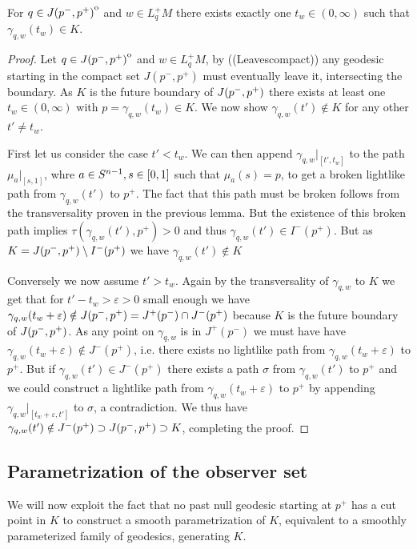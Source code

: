 \begin{lemma}\label{lem:hitsonce}
    For $q\in {\kern0ptJ(p^-,p^+)}^{\mathrm{o}}$ and $w\in L^+_qM$ there exists exactly one $t_w\in (0,\infty)$ such that $\gamma_{q,w}(t_w)\in K$.
\end{lemma}
\begin{proof}
    Let $q\in {\kern0ptJ(p^-,p^+)}^{\mathrm{o}}$ and $w\in L^+_qM$, by ((Leavescompact)) any geodesic starting in the compact set $J(p^-,p^+)$ must eventually leave it, intersecting the boundary. As $K$ is the future boundary of $J(p^-,p^+)$ there exists at least one $t_w\in (0,\infty)$ with $p=\gamma_{q,w}(t_w)\in K$. We now show $\gamma_{q,w}(t')\notin K$ for any other $t'\neq t_w$.

    First let us consider the case $t'<t_w$. We can then append $\gamma_{q,w}\rvert_{[t',t_w]}$ to the path $\mu_a\rvert_{[s,1]}$, whre $a\in {S^{n-1}}, s\in [0,1]$ such that $\mu_a(s)=p$, to get a broken lightlike path from $\gamma_{q,w}(t')$ to $p^+$. The fact that this path must be broken follows from the transversality proven in the previous lemma. But the existence of this broken path implies $\tau(\gamma_{q,w}(t'),p^+)>0$ and thus $\gamma_{q,w}(t')\in I^-(p^+)$. But as $K=J(p^-,p^+)\setminus I^-(p^+)$ we have $\gamma_{q,w}(t')\notin K$

    Conversely we now assume $t'>t_w$. Again by the transversality of $\gamma_{q,w}$ to $K$ we get that for $t'-t_w>\varepsilon>0$ small enough we have $\gamma_{q,w}(t_w+\varepsilon)\notin J(p^-,p^+)=J^+(p^-)\cap J^-(p^+)$ because $K$ is the future boundary of $J(p^-,p^+)$. As any point on $\gamma_{q,w}$ is in $J^+(p^-)$ we must have have $\gamma_{q,w}(t_w+\varepsilon) \notin J^-(p^+)$, i.e. there exists no lightlike path from $\gamma_{q,w}(t_w+\varepsilon)$ to $p^+$. But if $\gamma_{q,w}(t')\in J^-(p^+)$ there exists a path $\sigma$ from $\gamma_{q,w}(t')$ to $p^+$ and we could construct a lightlike path from $\gamma_{q,w}(t_w+\varepsilon)$ to $p^+$ by appending $\gamma_{q,w}\rvert_{[t_w+\varepsilon,t']}$ to  $\sigma$, a contradiction. We thus have $\gamma_{q,w}(t')\notin J^-(p^+)\supset J(p^-,p^+)\supset K$, completing the proof.
\end{proof}

\subsection{Parametrization of the observer set}
We will now exploit the fact that no past null geodesic starting at $p^+$ has a cut point in $K$ to construct a smooth parametrization of $K$, equivalent to a smoothly parameterized family of geodesics, generating $K$.

